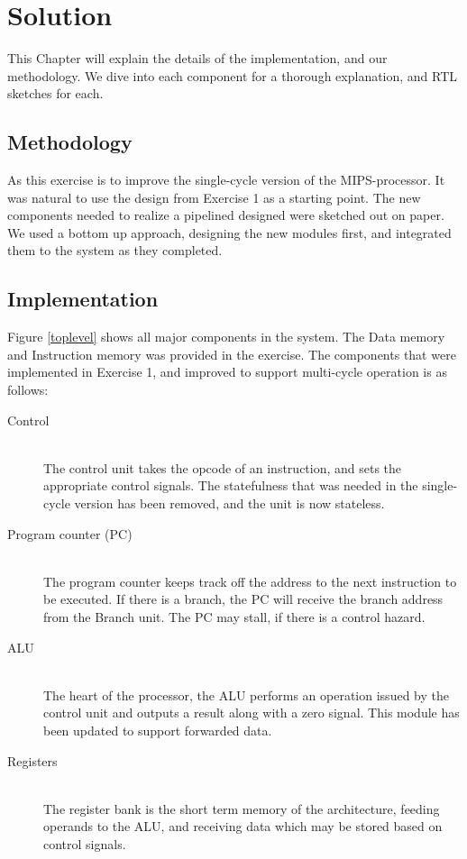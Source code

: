 \chapter{Solution}
This Chapter will explain the details of the implementation, and our methodology. We dive into each component for a thorough explanation, and RTL sketches for each.


\section{Methodology}
As this exercise is to improve the single-cycle version of the MIPS-processor. It was natural to use the design from Exercise 1 \cite{ex1report} as a starting point.
The new components needed to realize a pipelined designed were sketched out on paper. We used a bottom up approach, designing the new modules first, and integrated them to the system as they completed.

\section{Implementation}
Figure \ref{toplevel} shows all major components in the system. 
The Data memory and Instruction memory was provided in the exercise.
The components that were implemented in Exercise 1, and improved to support multi-cycle operation is as follows:

\begin{description}
  \item[Control] \hfill \\
  The control unit takes the opcode of an instruction, and sets the appropriate control signals. The statefulness that was needed in the single-cycle version has been removed, and the unit is now stateless.  
  \item[Program counter (PC)] \hfill \\
  The program counter keeps track off the address to the next instruction to be executed. If there is a branch, the PC will receive the branch address from the Branch unit. The PC may stall, if there is a control hazard.
  \item[ALU] \hfill \\
  The heart of the processor, the ALU performs an operation issued by the control unit and outputs a result along with a zero signal. This module has been updated to support forwarded data.
  \item[Registers] \hfill \\
  The register bank is the short term memory of the architecture, feeding operands to the ALU, and receiving data which may be stored based on control signals.
\end{description}

